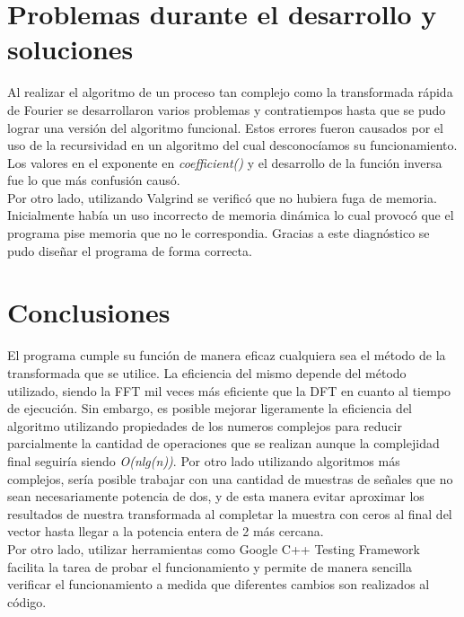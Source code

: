\documentclass[12pt,a4paper]{report}
\begin{document}
	\section{Problemas durante el desarrollo y soluciones}
		
        \indent Al realizar el algoritmo de un proceso tan complejo como la transformada rápida de Fourier se desarrollaron varios
        problemas y contratiempos hasta que se pudo lograr una versión del algoritmo funcional. Estos errores fueron causados por el
        uso de la recursividad en un algoritmo del cual desconocíamos su funcionamiento. Los valores en el exponente en \textit{coefficient()} 
        y el desarrollo de la función inversa fue lo que más confusión causó.
        \\
        \indent Por otro lado, utilizando Valgrind se verificó que no hubiera fuga de memoria. Inicialmente había un uso incorrecto de
        memoria dinámica lo cual provocó que el programa pise memoria que no le correspondia. Gracias a este diagnóstico se pudo diseñar 
        el programa de forma correcta.

   

	\section{Conclusiones}
	
		\indent	El programa cumple su función de manera eficaz cualquiera sea el método de la transformada que se utilice. La eficiencia
		del mismo depende del método utilizado, siendo la FFT mil veces más eficiente que la DFT en cuanto al tiempo de ejecución. Sin
		embargo, es posible mejorar ligeramente	la eficiencia del algoritmo utilizando propiedades de los numeros complejos para reducir
		parcialmente la cantidad de operaciones que se	realizan aunque la complejidad final seguiría siendo \textit{O(nlg(n))}. Por otro 
		lado utilizando algoritmos más complejos, sería posible	trabajar con una cantidad de muestras de señales que no sean
		necesariamente potencia de dos, y de esta manera evitar aproximar los resultados de nuestra transformada al completar la muestra 
		con ceros al final del vector hasta llegar a la potencia entera de 2 más cercana.
		\\
		\indent Por otro lado, utilizar herramientas como Google C++ Testing Framework facilita la tarea de probar el funcionamiento y permite
		de manera sencilla verificar el	funcionamiento a medida que diferentes cambios son realizados al código.
\end{document}

